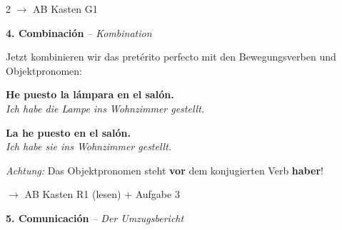 \documentclass[11pt, a4paper]{article}
\newcommand{\seriftext}[1]{{\fontfamily{ppl}\selectfont #1}}
\newcommand{\es}[1]{\seriftext{\textbf{#1}}}
\newcommand{\de}[1]{\textit{\textcolor{akzent}{#1}}}
\newcommand{\abmark}[1]{{\footnotesize\textcolor{akzent}{$\rightarrow$ AB #1}}}
\newcommand{\abschnitt}[2]{\noindent\textbf{\large #1. #2}}
\begin{document}
\begin{multicols}{2}
\abmark{Kasten G1}

\vspace{8pt}

\abschnitt{4}{Combinación} \de{-- Kombination}

\vspace{4pt}

Jetzt kombinieren wir das pretérito perfecto mit den Bewegungsverben und Objektpronomen:

\vspace{3pt}

{\footnotesize
\es{He puesto la lámpara en el salón.}\\
\de{Ich habe die Lampe ins Wohnzimmer gestellt.}

\vspace{3pt}

\es{La he puesto en el salón.}\\
\de{Ich habe sie ins Wohnzimmer gestellt.}
}

\begin{tippbox}
\footnotesize\textit{Achtung:} Das Objektpronomen steht \textbf{vor} dem konjugierten Verb \es{haber}!
\end{tippbox}

\abmark{Kasten R1 (lesen) + Aufgabe 3}

\end{multicols}


\vspace{4pt}

\abschnitt{5}{Comunicación} \de{-- Der Umzugsbericht}

\vspace{4pt}
\end{document}
